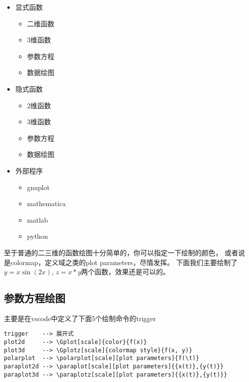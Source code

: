 \documentclass[lang=cn, math=mathptmx]{ZLaTeX}
\begin{document}
\begin{framed}
\begin{multicols}{3}
    \begin{itemize}    
        \item 显式函数
            \begin{itemize}
                \item 二维函数
                \item 3维函数
                \item 参数方程
                \item 数据绘图
            \end{itemize}
        \item 隐式函数
        \begin{itemize}
            \item 2维函数
            \item 3维函数
            \item 参数方程
            \item 数据绘图
        \end{itemize} 
        \item 外部程序
        \begin{itemize}
            \item gnuplot 
            \item mathematica
            \item matlab
            \item python
        \end{itemize} 
\end{itemize} 
\end{multicols}
\end{framed}


\newcommand{\Note}[1]{\texttt{#1}}
至于普通的二三维的函数绘图十分简单的，你可以指定一下绘制的颜色，
或者说是colormap，定义域之类的plot parameters，尽情发挥。
下面我们主要绘制了 $y=x\sin(2x)$, $z=x*y$两个函数，效果还是可以的。

\nomargin
\begin{center}

\end{center}

\subsection{参数方程绘图}
主要是在vscode中定义了下面5个绘制命令的trigger
\begin{lstlisting}
trigger    --> 展开式
plot2d     --> \Gplot[scale]{color}{f(x)}
plot3d     --> \Gplotz[scale]{colormap style}{f(x, y)}
polarplot  --> \polarplot[scale][plot parameters]{f(\t)}
paraplot2d --> \paraplot[scale][plot parameters]{{x(t)},{y(t)}}
paraplot3d --> \paraplotz[scale][plot parameters]{{x(t)},{y(t)}}
\end{lstlisting}
\end{document}
